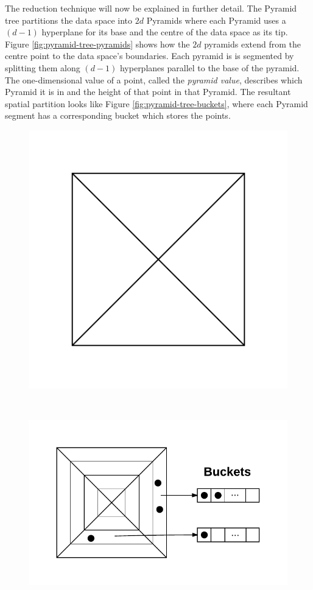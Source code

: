 The reduction technique will now be explained in further detail. The Pyramid tree partitions the data space into $2d$ Pyramids where each Pyramid uses a $(d - 1)$ hyperplane for its base and the centre of the data space as its tip. Figure \ref{fig:pyramid-tree-pyramids} shows how the $2d$ pyramids extend from the centre point to the data space's boundaries. Each pyramid is is segmented by splitting them along $(d-1)$ hyperplanes parallel to the base of the pyramid. The one-dimensional value of a point, called the \textit{pyramid value}, describes which Pyramid it is in and the height of that point in that Pyramid. The resultant spatial partition looks like Figure \ref{fig:pyramid-tree-buckets}, where each Pyramid segment has a corresponding bucket which stores the points.

\begin{figure}
		\begin{center}
			\begin{subfloat}{%
				\includegraphics[scale=0.5]{figures/pyramid_tree_partition.pdf}
			}
			\end{subfloat}~
			\begin{subfloat} {%
				\includegraphics[scale=0.5]{figures/pyramid_tree_buckets.pdf}
			}

\end{subfloat}
\end{center}
\end{figure}
